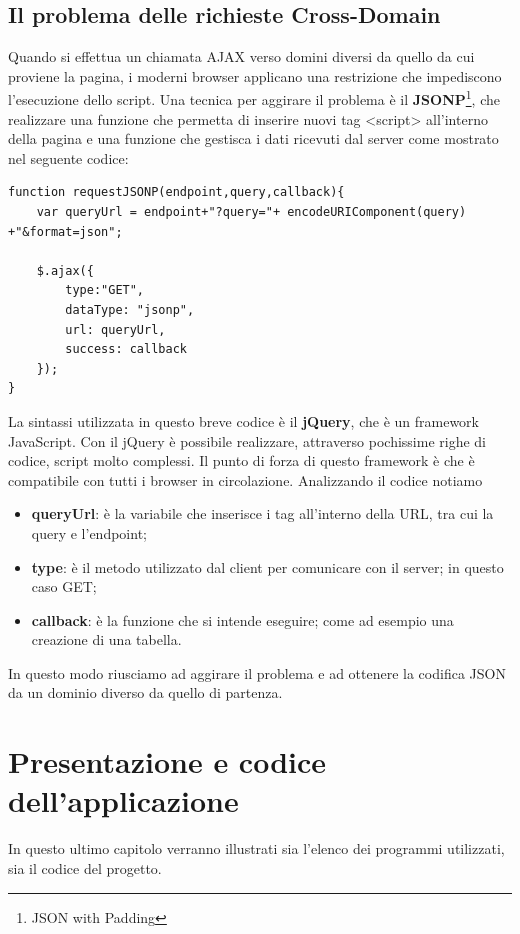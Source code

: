 \documentclass[a4paper,11pt]{article}
\begin{document}
\subsection{Il problema delle richieste Cross-Domain}
\label{sec:5.4}
Quando si effettua un chiamata AJAX verso domini diversi da quello da cui proviene la pagina, i moderni browser applicano una restrizione che impediscono l'esecuzione dello script.
Una tecnica per aggirare il problema è il \textbf{JSONP}\footnote{JSON with Padding}, che realizzare una funzione che permetta di inserire nuovi tag <script> all'interno della pagina e una funzione che gestisca i dati ricevuti dal server come mostrato nel seguente codice:

\begin{lstlisting}[style=htmlcssjs]
function requestJSONP(endpoint,query,callback){
	var queryUrl = endpoint+"?query="+ encodeURIComponent(query) +"&format=json";
	
	$.ajax({
       	type:"GET",
       	dataType: "jsonp",  
        url: queryUrl,
        success: callback
    });
}
\end{lstlisting}
La sintassi utilizzata in questo breve codice è il \textbf{jQuery}, che è un framework JavaScript.
Con il jQuery è possibile realizzare, attraverso pochissime righe di codice, script molto complessi. Il punto di forza di questo framework è che è compatibile con tutti i browser in circolazione. \newline
Analizzando il codice notiamo
\begin{itemize}
\item \textbf{queryUrl}: è la variabile che inserisce i tag all'interno della URL, tra cui la query e l'endpoint;
\item \textbf{type}: è il metodo utilizzato dal client per comunicare con il server; in questo caso GET;
\item \textbf{callback}: è la funzione che si intende eseguire; come ad esempio una creazione di una tabella.
\end{itemize}

In questo modo riusciamo ad aggirare il problema e ad ottenere la codifica JSON da un dominio diverso da quello di partenza.
\newpage
\section{Presentazione e codice dell'applicazione}
\label{sec:6}
In questo ultimo capitolo verranno illustrati sia l'elenco dei programmi utilizzati, sia il codice del progetto.
\end{document}
